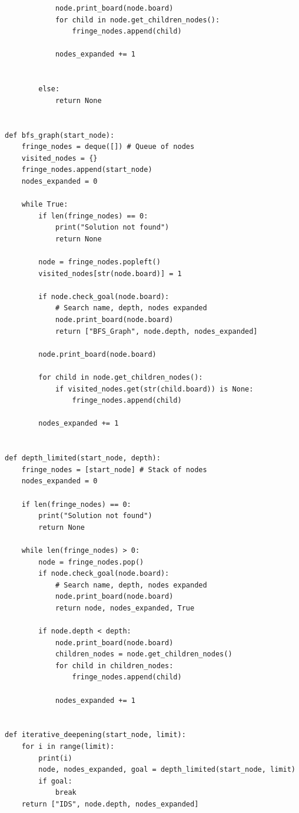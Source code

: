 \documentclass[10pt]{article}
\begin{document}
\begin{lstlisting}
            node.print_board(node.board)
            for child in node.get_children_nodes():
                fringe_nodes.append(child)
            
            nodes_expanded += 1
            

        else:
            return None


def bfs_graph(start_node):
    fringe_nodes = deque([]) # Queue of nodes
    visited_nodes = {}
    fringe_nodes.append(start_node)
    nodes_expanded = 0

    while True:
        if len(fringe_nodes) == 0:
            print("Solution not found")
            return None
        
        node = fringe_nodes.popleft()
        visited_nodes[str(node.board)] = 1

        if node.check_goal(node.board):
            # Search name, depth, nodes expanded
            node.print_board(node.board)
            return ["BFS_Graph", node.depth, nodes_expanded]
        
        node.print_board(node.board)

        for child in node.get_children_nodes():
            if visited_nodes.get(str(child.board)) is None:
                fringe_nodes.append(child)
        
        nodes_expanded += 1


def depth_limited(start_node, depth):
    fringe_nodes = [start_node] # Stack of nodes
    nodes_expanded = 0

    if len(fringe_nodes) == 0:
        print("Solution not found")
        return None
        
    while len(fringe_nodes) > 0:
        node = fringe_nodes.pop()
        if node.check_goal(node.board):
            # Search name, depth, nodes expanded
            node.print_board(node.board)
            return node, nodes_expanded, True

        if node.depth < depth:
            node.print_board(node.board)
            children_nodes = node.get_children_nodes()
            for child in children_nodes:
                fringe_nodes.append(child)

            nodes_expanded += 1


def iterative_deepening(start_node, limit):
    for i in range(limit):
        print(i)
        node, nodes_expanded, goal = depth_limited(start_node, limit)
        if goal:
            break
    return ["IDS", node.depth, nodes_expanded]
    


\end{lstlisting}
\end{document}
